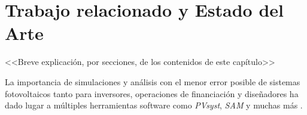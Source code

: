 \chapter{Trabajo relacionado y Estado del Arte} \label{chp:state-of-the-art}

<<Breve explicación, por secciones, de los contenidos de este capítulo>>


La importancia de simulaciones y análisis con el menor error posible de sistemas fotovoltaicos tanto para inversores, operaciones de financiación y diseñadores ha dado lugar a múltiples herramientas software como \textit{PVsyst}, \textit{SAM} y muchas más \cite{stein_models_2009}.

